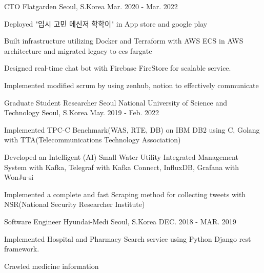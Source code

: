 \begin{cventries}
  \cventry
    {CTO} %
    {Flatgarden} %
    {Seoul, S.Korea} %
    {Mar. 2020 - Mar. 2022} %
    {
      \begin{cvitems} %
        \item {Deployed "입시 고민 메신저 학학이" in App store and google play}
        \item {Built infrastructure utilizing Docker and Terraform with AWS ECS in AWS architecture and migrated legacy to ecs fargate}
        \item {Designed real-time chat bot with Firebase FireStore for scalable service.}
        \item {Implemented modified scrum by using zenhub, notion to effectively communicate}
      \end{cvitems}
    }

  \cventry
    {Graduate Student Researcher} %
    {Seoul National University of Science and Technology} %
    {Seoul, S.Korea} %
    {May. 2019 - Feb. 2022} %
    {
      \begin{cvitems} %
        \item {Implemented TPC-C Benchmark(WAS, RTE, DB) on IBM DB2 using C, Golang with TTA(Telecommunications Technology Association)}
        \item {Developed an Intelligent (AI) Small Water Utility Integrated Management System with Kafka, Telegraf with Kafka Connect, InfluxDB, Grafana with WonJu-si}
        \item {Implemented a complete and fast Scraping method for collecting tweets with NSR(National Security Researcher Institute) }
      \end{cvitems}
    }

  \cventry
    {Software Engineer} %
    {Hyundai-Medi} %
    {Seoul, S.Korea} %
    {DEC. 2018 - MAR. 2019} %
    {
      \begin{cvitems} %
        \item {Implemented Hospital and Pharmacy Search service using Python Django rest framework.}
        \item {Crawled medicine information}
      \end{cvitems}
    }


\end{cventries}
